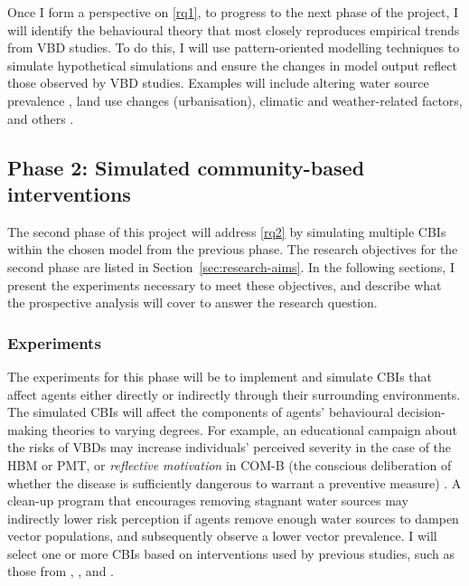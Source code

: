 Once I form a perspective on \ref{rq1}, to progress to the next phase of the project, I will identify the behavioural theory that most closely reproduces empirical trends from VBD studies. To do this, I will use pattern-oriented modelling techniques \cite{gallagher_theory_2021} to simulate hypothetical simulations and ensure the changes in model output reflect those observed by VBD studies. Examples will include altering water source prevalence \cite{molyneux_patterns_1997}, land use changes (urbanisation), climatic and weather-related factors, and others \cite{swei_patterns_2020}.


\subsection{Phase 2: Simulated community-based interventions}

The second phase of this project will address \ref{rq2} by simulating multiple CBIs within the chosen model from the previous phase. The research objectives for the second phase are listed in Section~\ref{sec:research-aims}. In the following sections, I present the experiments necessary to meet these objectives, and describe what the prospective analysis will cover to answer the research question.

\subsubsection{Experiments}

The experiments for this phase will be to implement and simulate CBIs that affect agents either directly or indirectly through their surrounding environments. The simulated CBIs will affect the components of agents' behavioural decision-making theories to varying degrees. For example, an educational campaign about the risks of VBDs may increase individuals' perceived severity in the case of the HBM or PMT, or \textit{reflective motivation} in COM-B (the conscious deliberation of whether the disease is sufficiently dangerous to warrant a preventive measure) \cite{michie_behaviour_2011}. A clean-up program that encourages removing stagnant water sources may indirectly lower risk perception if agents remove enough water sources to dampen vector populations, and subsequently observe a lower vector prevalence. I will select one or more CBIs based on interventions used by previous studies, such as those from \citet{tapia-conyer_community_2012}, \citet{rivera_adoption_2023}, and \citet{perez_realist_2021}.

